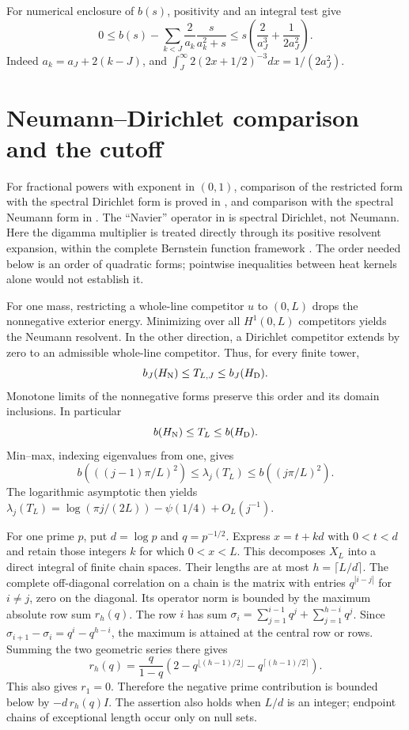For numerical enclosure of $b(s)$, positivity and an integral test give
\begin{equation}\label{d:b-tail}
0\le b(s)-\sum_{k<J}\frac2{a_k}\frac{s}{a_k^2+s}
\le s\left(\frac2{a_J^3}+\frac1{2a_J^2}\right).
\end{equation}
Indeed $a_k=a_J+2(k-J)$, and
$\int_J^\infty 2(2x+1/2)^{-3}dx=1/(2a_J^2)$.

\section{Neumann--Dirichlet comparison and the cutoff}
For fractional powers with exponent in $(0,1)$, comparison of the restricted
form with the spectral Dirichlet form is proved in \cite[Theorem 2]{MN},
and comparison with the spectral Neumann form in \cite[Theorem 3]{Nazarov}.
The ``Navier'' operator in \cite{MN} is spectral Dirichlet, not Neumann.
Here the digamma multiplier is treated directly through its positive
resolvent expansion, within the complete Bernstein function framework
\cite{KM}. The order needed below is an order of quadratic forms;
pointwise inequalities between heat kernels alone would not establish it.

For one mass, restricting a whole-line competitor $u$ to $(0,L)$ drops
the nonnegative exterior energy. Minimizing over all $H^1(0,L)$
competitors yields the Neumann resolvent. In the other direction, a
Dirichlet competitor extends by zero to an admissible whole-line
competitor. Thus, for every finite tower,
\[
b_J(H_{\rm N})\le T_{L,J}\le b_J(H_{\rm D}).
\]
Monotone limits of the nonnegative forms preserve this order and its
domain inclusions. In particular
\begin{equation}\label{d:ND}
b(H_{\rm N})\le T_L\le b(H_{\rm D}).
\end{equation}
Min--max, indexing eigenvalues from one, gives
\[
b(((j-1)\pi/L)^2)\le\lambda_j(T_L)\le b((j\pi/L)^2).
\]
The logarithmic asymptotic then yields
$\lambda_j(T_L)=\log(\pi j/(2L))-\psi(1/4)+O_L(j^{-1})$.

For one prime $p$, put $d=\log p$ and $q=p^{-1/2}$. Express $x=t+kd$
with $0<t<d$ and retain those integers $k$ for which $0<x<L$.
This decomposes $X_L$ into a direct integral of finite chain spaces.
Their lengths are at most $h=\lceil L/d\rceil$. The complete off-diagonal
correlation on a chain is the matrix with entries
$q^{|i-j|}$ for $i\ne j$, zero on the diagonal. Its operator norm is
bounded by the maximum absolute row sum $r_h(q)$. The row $i$ has
sum $\sigma_i=\sum_{j=1}^{i-1}q^j+\sum_{j=1}^{h-i}q^j$.
Since $\sigma_{i+1}-\sigma_i=q^i-q^{h-i}$, the maximum is attained
at the central row or rows. Summing the two geometric series there gives
\[
r_h(q)=\frac q{1-q}
\left(2-q^{\lfloor(h-1)/2\rfloor}-q^{\lceil(h-1)/2\rceil}\right).
\]
This also gives $r_1=0$. Therefore the negative prime contribution is
bounded below by $-d\,r_h(q)I$. The assertion also
holds when $L/d$ is an integer; endpoint chains of exceptional length
occur only on null sets.

